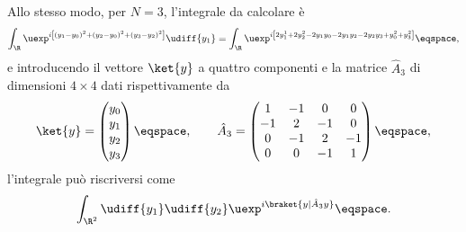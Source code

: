 Allo stesso modo, per $N=3$,
l'integrale da calcolare \`e
\begin{displaymath}
\int_{\R} \uexp^{ i  \left[ \left( y_{1} - y_{0} \right)^{2} + \left( y_{2} -
y_{0} \right)^{2} + \left( y_{3} - y_{2} \right)^{2}\right] } \udiff{y_{1}}  
= \int_{\R} \uexp^{i \left[  2  y_{1}^{1}  +2y_{2}^{2} -2 y_{1} y_{0} - 2 y_{1} y_{2}
-2y_{2} y_{3} + y_{0}^{2} 
+ y_{3} ^{2}\right]} \eqspace, 
\end{displaymath}
e introducendo il vettore $\ket{y}$ a quattro componenti  e la matrice
$\hat{A}_{3}$ di dimensioni $4\times 4$ dati rispettivamente da
\begin{displaymath}
\ket{y} = \begin{pmatrix} 
y_{0} \\ y_{1} \\ y_{2}  \\ y_{3}
\end{pmatrix} \eqspace , \qquad 
\hat{A}_{3}  =  \begin{pmatrix} 1 & -1 & 0  & 0 \\ -1 & 2 & -1 & 0 \\ 
0 & -1 & 2 & -1  \\ 0 & 0 & -1 & 1 
\end{pmatrix}
\eqspace ,
\end{displaymath}
l'integrale pu\`o riscriversi come 
\begin{displaymath}
\int_{\R^{2} } \udiff{y_{1}} \udiff{y_{2}} \uexp^{ i \braket{y|\hat{A}_{3} y}}
\eqspace .
\end{displaymath}

